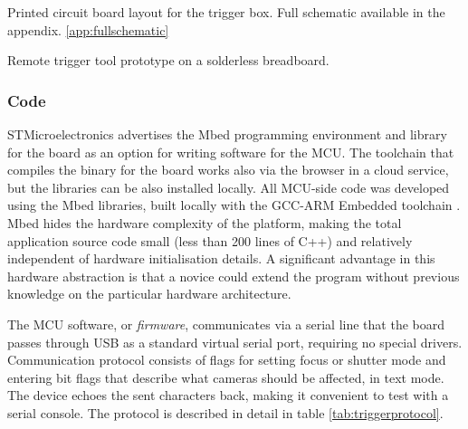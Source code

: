 
{Printed circuit board layout for the trigger box. Full schematic available in the appendix. \ref{app:fullschematic}}

{Remote trigger tool prototype on a solderless breadboard.}


\subsubsection{Code}

STMicroelectronics advertises the Mbed programming environment and library for the board as an option for writing software for the MCU. \cite{mbednucleo}
The toolchain that compiles the binary for the board works also via the browser in a cloud service, but the libraries can be also installed locally.
All MCU-side code was developed using the Mbed libraries, built locally with the GCC-ARM Embedded toolchain \cite{launchpad-gcc-arm}.
Mbed hides the hardware complexity of the platform, making the total application source code small (less than 200 lines of C++) and relatively independent of hardware initialisation details.
A significant advantage in this hardware abstraction is that a novice could extend the program without previous knowledge on the particular hardware architecture.

The MCU software, or \emph{firmware}, communicates via a serial line that the board passes through USB as a standard virtual serial port, requiring no special drivers.
Communication protocol consists of flags for setting focus or shutter mode and entering bit flags that describe what cameras should be affected, in text mode.
The device echoes the sent characters back, making it convenient to test with a serial console.
The protocol is described in detail in table \ref{tab:triggerprotocol}.

